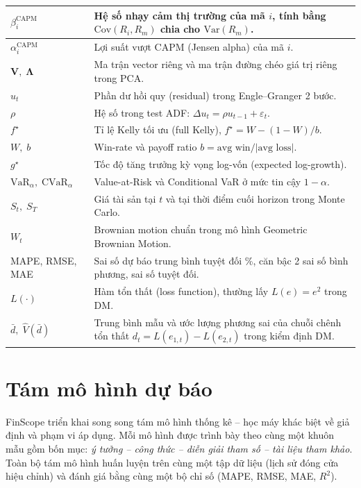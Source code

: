 \documentclass[12pt,a4paper,openany,oneside]{report}
\numberwithin{equation}{chapter}
\begin{document}
{\begin{longtable}{|>{\raggedright\arraybackslash}p{3.3cm}|>{\raggedright\arraybackslash}p{11.5cm}|}
\hline
$\beta_i^{\text{CAPM}}$ & Hệ số nhạy cảm thị trường của mã $i$, tính bằng $\mathrm{Cov}(R_i,R_m)$ chia cho $\mathrm{Var}(R_m)$. \\
\hline
$\alpha_i^{\text{CAPM}}$ & Lợi suất vượt CAPM (Jensen alpha) của mã $i$. \\
\hline
$\mathbf{V},\; \boldsymbol{\Lambda}$ & Ma trận vector riêng và ma trận đường chéo giá trị riêng trong PCA. \\
\hline
$u_t$ & Phần dư hồi quy (residual) trong Engle--Granger 2 bước. \\
\hline
$\rho$ & Hệ số trong test ADF: $\Delta u_t = \rho u_{t-1} + \varepsilon_t$. \\
\hline
$f^{\star}$ & Tỉ lệ Kelly tối ưu (full Kelly), $f^{\star} = W - (1-W)/b$. \\
\hline
$W,\; b$ & Win-rate và payoff ratio $b = \text{avg win}/|\text{avg loss}|$. \\
\hline
$g^{\star}$ & Tốc độ tăng trưởng kỳ vọng log-vốn (expected log-growth). \\
\hline
$\text{VaR}_\alpha,\; \text{CVaR}_\alpha$ & Value-at-Risk và Conditional VaR ở mức tin cậy $1-\alpha$. \\
\hline
$S_t,\; S_T$ & Giá tài sản tại $t$ và tại thời điểm cuối horizon trong Monte Carlo. \\
\hline
$W_t$ & Brownian motion chuẩn trong mô hình Geometric Brownian Motion. \\
\hline
MAPE, RMSE, MAE & Sai số dự báo trung bình tuyệt đối \%, căn bậc 2 sai số bình phương, sai số tuyệt đối. \\
\hline
$L(\cdot)$ & Hàm tổn thất (loss function), thường lấy $L(e) = e^2$ trong DM. \\
\hline
$\bar{d},\; \hat{V}(\bar{d})$ & Trung bình mẫu và ước lượng phương sai của chuỗi chênh tổn thất $d_t = L(e_{1,t}) - L(e_{2,t})$ trong kiểm định DM. \\
\hline
\end{longtable}}

\section{Tám mô hình dự báo}

\indent FinScope triển khai song song tám mô hình thống kê -- học máy
khác biệt về giả định và phạm vi áp dụng. Mỗi mô hình được trình bày
theo cùng một khuôn mẫu gồm bốn mục: \emph{ý tưởng -- công thức -- diễn
giải tham số -- tài liệu tham khảo}. Toàn bộ tám mô hình huấn luyện trên
cùng một tập dữ liệu (lịch sử đóng cửa hiệu chỉnh) và đánh giá bằng
cùng một bộ chỉ số (MAPE, RMSE, MAE, $R^2$).
\end{document}
